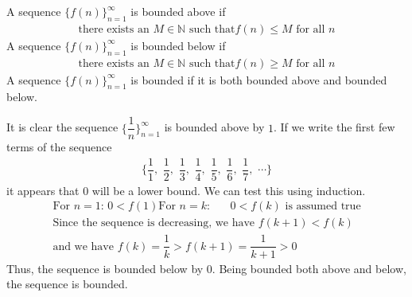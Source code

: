 \begin{definition}
A sequence $\{f(n)\}_{n=1}^{\infty}$ is bounded above if
\begin{align*}
    \text{there exists an} \hspace{4pt} M \in \mathbb{N} \hspace{4pt} \text{such that} f(n) \leq M \hspace{4pt} \text{for all} \hspace{4pt} n
\end{align*}
A sequence $\{f(n)\}_{n=1}^{\infty}$ is bounded below if
\begin{align*}
    \text{there exists an} \hspace{4pt} M \in \mathbb{N} \hspace{4pt} \text{such that} f(n) \geq M \hspace{4pt} \text{for all} \hspace{4pt} n
\end{align*}
A sequence $\{f(n)\}_{n=1}^{\infty}$ is bounded if it is both bounded above and bounded below.
\end{definition}

\begin{example}
It is clear the sequence $\Big\{\dfrac{1}{n}\Big\}_{n=1}^{\infty}$ is bounded above by $1$. If we write the first few terms of the sequence
\begin{align*}
    \Big\{\dfrac{1}{1}, \hspace{4pt} \dfrac{1}{2}, \hspace{4pt} \dfrac{1}{3}, \hspace{4pt} \dfrac{1}{4}, \hspace{4pt} \dfrac{1}{5}, \hspace{4pt} \dfrac{1}{6}, \hspace{4pt} \dfrac{1}{7}, \hspace{4pt} \cdots \Big\}
\end{align*}
it appears that $0$ will be a lower bound. We can test this using induction.
\begin{align*}
    \text{For} \hspace{4pt} n=1: \hspace{2pt} 0 < f(1)
    \text{For} \hspace{4pt} n=k: \hspace{20pt} 0 < f(k) \hspace{4pt} \text{is assumed true}\\[2ex]
    \text{Since the sequence is decreasing, we have} \hspace{4pt} f(k+1) < f(k)\\[2ex]
    \text{and we have} \hspace{4pt} f(k) = \dfrac{1}{k} > f(k+1) = \dfrac{1}{k+1} > 0 
\end{align*}
Thus, the sequence is bounded below by $0$. Being bounded both above and below, the sequence is bounded.
\end{example}


